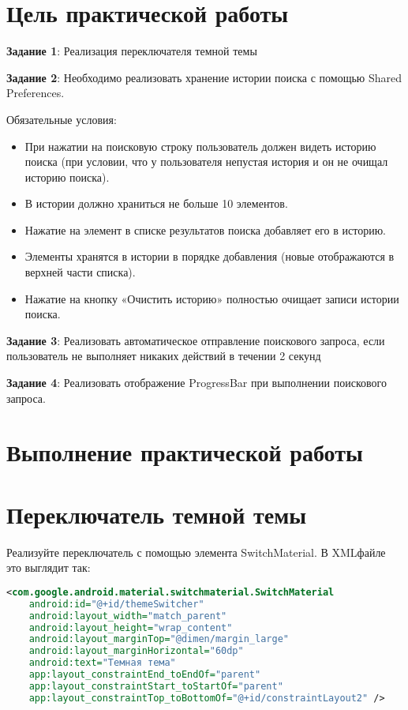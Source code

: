 \section*{\LARGE Цель практической работы}

\textbf{Задание 1}: Реализация переключателя темной темы

\textbf{Задание 2}: Необходимо реализовать хранение истории поиска с помощью
Shared Preferences.

Обязательные условия:
\begin{itemize}
	\item При нажатии на поисковую строку пользователь должен видеть историю
		поиска (при условии, что у пользователя непустая история и он не
		очищал историю поиска).
	\item В истории должно храниться не больше 10 элементов.
	\item Нажатие на элемент в списке результатов поиска добавляет его в
		историю.
	\item Элементы хранятся в истории в порядке добавления (новые
		отображаются в верхней части списка).
	\item Нажатие на кнопку «Очистить историю» полностью очищает записи
		истории поиска.
\end{itemize}

\textbf{Задание 3}: Реализовать автоматическое отправление поискового запроса,
если пользователь не выполняет никаких действий в течении 2 секунд

\textbf{Задание 4}: Реализовать отображение ProgressBar при выполнении
поискового запроса.

\clearpage

\section*{\LARGE Выполнение практической работы}

\section{Переключатель темной темы}

Реализуйте переключатель с помощью элемента SwitchMaterial.
В XMLфайле это выглядит так:

\begin{lstlisting}[language=XML]
<com.google.android.material.switchmaterial.SwitchMaterial
	android:id="@+id/themeSwitcher"
	android:layout_width="match_parent"
	android:layout_height="wrap_content"
	android:layout_marginTop="@dimen/margin_large"
	android:layout_marginHorizontal="60dp"
	android:text="Темная тема"
	app:layout_constraintEnd_toEndOf="parent"
	app:layout_constraintStart_toStartOf="parent"
	app:layout_constraintTop_toBottomOf="@+id/constraintLayout2" />
\end{lstlisting}

